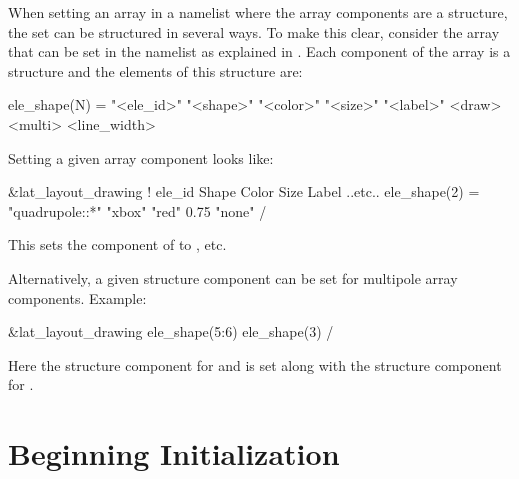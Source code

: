 When setting an array in a namelist where the array components are a structure, the set can be
structured in several ways. To make this clear, consider the  array that can be set
in the  namelist as explained in . Each component
of the  array is a structure and the elements of this structure are:
\begin{example}
  ele_shape(N) = "<ele_id>" "<shape>" "<color>" "<size>" "<label>" <draw> <multi> <line_width>
\end{example}
Setting a given  array component looks like:
\begin{example}
  &lat_layout_drawing
    !               ele_id                  Shape      Color     Size  Label  ..etc..
    ele_shape(2) = "quadrupole::*"          "xbox"     "red"     0.75  "none" 
  /
\end{example}
This sets the  component of  to , etc.

Alternatively, a given structure component can be set for multipole array components. Example:
\begin{example}
  &lat_layout_drawing
    ele_shape(5:6)%
    ele_shape(3)%
  /
\end{example}
Here the  structure component for  and  is set along
with the  structure component for .

\section{Beginning Initialization}
\label{s:init.begin} 

